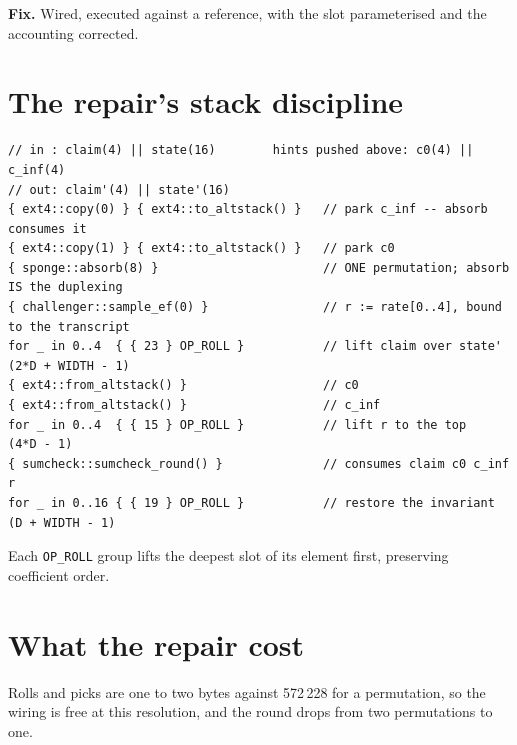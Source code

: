 \documentclass[11pt,a4paper]{article}
\newcommand{\defectend}{\par\vspace{0.2em}\noindent{\color{signal}\rule{\linewidth}{1.2pt}}\par\medskip}
\begin{document}
\textbf{Fix.} Wired, executed against a reference, with the slot parameterised and the accounting
corrected.
\defectend

\section{The repair's stack discipline}

\begin{lstlisting}
// in : claim(4) || state(16)        hints pushed above: c0(4) || c_inf(4)
// out: claim'(4) || state'(16)
{ ext4::copy(0) } { ext4::to_altstack() }   // park c_inf -- absorb consumes it
{ ext4::copy(1) } { ext4::to_altstack() }   // park c0
{ sponge::absorb(8) }                       // ONE permutation; absorb IS the duplexing
{ challenger::sample_ef(0) }                // r := rate[0..4], bound to the transcript
for _ in 0..4  { { 23 } OP_ROLL }           // lift claim over state'  (2*D + WIDTH - 1)
{ ext4::from_altstack() }                   // c0
{ ext4::from_altstack() }                   // c_inf
for _ in 0..4  { { 15 } OP_ROLL }           // lift r to the top       (4*D - 1)
{ sumcheck::sumcheck_round() }              // consumes claim c0 c_inf r
for _ in 0..16 { { 19 } OP_ROLL }           // restore the invariant   (D + WIDTH - 1)
\end{lstlisting}

Each \texttt{OP\_ROLL} group lifts the deepest slot of its element first, preserving coefficient
order.

\medskip
\noindent{}

\section{What the repair cost}

Rolls and picks are one to two bytes against 572\,228 for a permutation, so the wiring is free at
this resolution, and the round drops from two permutations to one.
\end{document}

